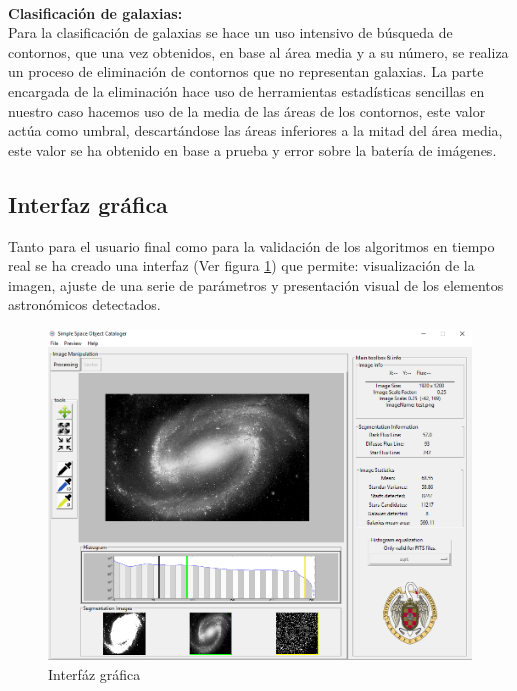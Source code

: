 	\\
	\textbf{Clasificación de galaxias:}\\
	Para la clasificación de galaxias se hace un uso intensivo de búsqueda de contornos, que una vez obtenidos, en base al área media y a su número, se realiza un proceso de eliminación de contornos que no representan galaxias. La parte encargada de la eliminación hace uso de herramientas estadísticas sencillas en nuestro caso hacemos uso de la media de las áreas de los contornos, este valor actúa como umbral, descartándose las áreas inferiores a la mitad del área media, este valor se ha obtenido en base a prueba y error sobre la batería de imágenes.

	\subsection{Interfaz gráfica}\label{GUI}
	Tanto para el usuario final como para la validación de los algoritmos en tiempo real se ha creado una interfaz (Ver figura \ref{fig:GUI_limpia}) que permite: visualización de la imagen, ajuste de una serie de parámetros y presentación visual de los elementos astronómicos detectados.\\
	\begin{figure}[!htb]
		\centering
		\includegraphics[width=1\textwidth]{images/gui/general.png}
		\caption{\label{fig:GUI_limpia}Interfáz gráfica}
	\end{figure}

